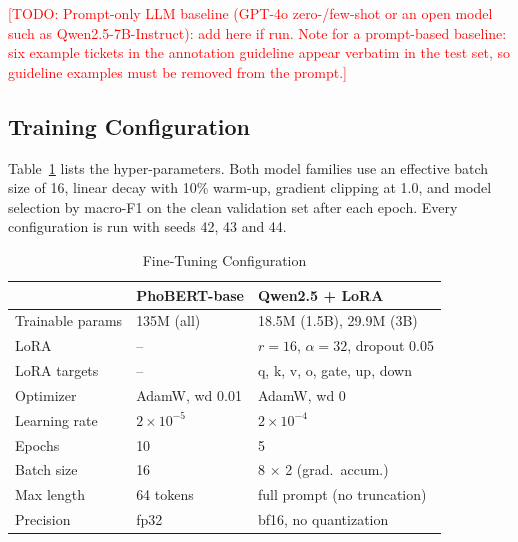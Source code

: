 \documentclass[conference]{IEEEtran}
\newcommand{\TODO}[1]{\textcolor{red}{[TODO: #1]}}
\begin{document}
\TODO{Prompt-only LLM baseline (GPT-4o zero-/few-shot or an open model such
as Qwen2.5-7B-Instruct): add here if run. Note for a prompt-based baseline:
six example tickets in the annotation guideline appear verbatim in the test
set, so guideline examples must be removed from the prompt.}

\subsection{Training Configuration}
Table~\ref{tab:config} lists the hyper-parameters. Both model families use
an effective batch size of 16, linear decay with 10\% warm-up, gradient
clipping at 1.0, and model selection by macro-F1 on the clean validation
set after each epoch. Every configuration is run with seeds 42, 43 and 44.

\begin{table}[htbp]
\caption{Fine-Tuning Configuration}
\label{tab:config}
\centering
\setlength{\tabcolsep}{4pt}
\begin{tabular}{lll}
\toprule
 & \textbf{PhoBERT-base} & \textbf{Qwen2.5 + LoRA} \\
\midrule
Trainable params & 135M (all)  & 18.5M (1.5B), 29.9M (3B) \\
LoRA             & --          & $r=16$, $\alpha=32$, dropout 0.05 \\
LoRA targets     & --          & q, k, v, o, gate, up, down \\
Optimizer        & AdamW, wd 0.01 & AdamW, wd 0 \\
Learning rate    & $2\times10^{-5}$ & $2\times10^{-4}$ \\
Epochs           & 10          & 5 \\
Batch size       & 16          & 8 $\times$ 2 (grad.\ accum.) \\
Max length       & 64 tokens   & full prompt (no truncation) \\
Precision        & fp32        & bf16, no quantization \\
\bottomrule
\end{tabular}
\end{table}
\end{document}
